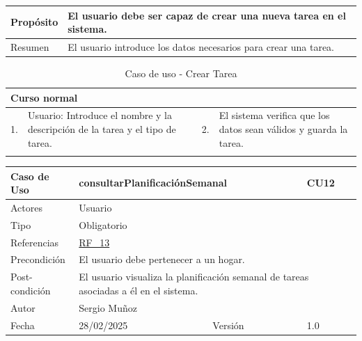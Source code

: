 \begin{table}[H]
    \centering
    \begin{tabular}{| m{} | m{} | m{} | m{} |}
        \hline
        Propósito & \multicolumn{3}{m{0.67\textwidth}|}{El usuario debe ser capaz de crear una nueva tarea en el sistema.} \\ 
        \hline
        Resumen & \multicolumn{3}{m{0.67\textwidth}|}{El usuario introduce los datos necesarios para crear una tarea.} \\ 
        \hline
    \end{tabular}
\end{table}

\begin{table}[H]
    \centering
    \begin{tabular}{| m{} | m{} | m{} | m{} |}
        \hline
        \multicolumn{4}{|m{0.9\textwidth}|}{Curso normal} \\ 
        \hline
        1. & Usuario: Introduce el nombre y la descripción de la tarea y el tipo de tarea. 
        & 2. & El sistema verifica que los datos sean válidos y guarda la tarea. \\ 
        \hline
         &  
        &  & \\ 
        \hline
    \end{tabular}
    \caption{Caso de uso - Crear Tarea}
\end{table}

\newpage

\begin{table}[H]
    \centering
    \begin{tabular}{| m{} | m{} | m{} | m{} |}
        \hline
        \rowcolor[HTML]{C0C0C0} Caso de Uso & \multicolumn{2}{|m{0.43\textwidth}|}{consultarPlanificaciónSemanal} &  CU12\\ 
        \hline
        Actores & \multicolumn{3}{l|}{Usuario} \\ 
        \hline
        Tipo & \multicolumn{3}{l|}{Obligatorio} \\ 
        \hline
        Referencias & \multicolumn{3}{l|}{\hyperref[req:RF13]{RF\_13}} \\ 
        \hline
        Precondición & \multicolumn{3}{m{0.67\textwidth}|}{El usuario debe pertenecer a un hogar.} \\ 
        \hline
        Post-condición & \multicolumn{3}{m{0.67\textwidth}|}{El usuario visualiza la planificación semanal de tareas asociadas a él en el sistema.} \\ 
        \hline
        Autor & \multicolumn{3}{l|}{Sergio Muñoz} \\ 
        \hline
        Fecha & 28/02/2025 & Versión & 1.0 \\ 
        \hline
    \end{tabular}
\end{table}

